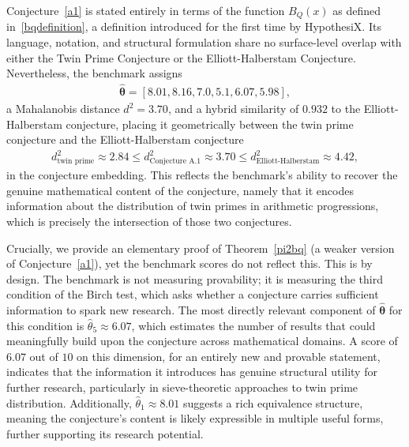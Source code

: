 \documentclass[11pt,reqno]{amsart}
\theoremstyle{plain}\newtheorem{theorem}{Theorem}[section]
\numberwithin{equation}{section}
\begin{document}
\noindent
Conjecture~\ref{a1} is stated entirely in terms of the function $B_Q(x)$ as defined in~\eqref{bqdefinition}, a definition introduced for the first time by HypothesiX. Its language, notation, and structural formulation share no surface-level overlap with either the Twin Prime Conjecture or the Elliott-Halberstam Conjecture. Nevertheless, the benchmark assigns
\begin{align*}
\hat{\bm{\theta}} = [8.01, 8.16, 7.0, 5.1, 6.07, 5.98],    
\end{align*}
\noindent
a Mahalanobis distance $d^2 = 3.70$, and a hybrid similarity of $0.932$ to the Elliott-Halberstam conjecture, placing it geometrically between the twin prime conjecture and the Elliott-Halberstam conjecture
\begin{align}\label{d2forbq}
d^2_{\text{twin prime}} \approx 2.84 
\leq d^2_{\text{Conjecture A.1}} \approx 3.70 
\leq d^2_{\text{Elliott-Halberstam}} \approx 4.42,
\end{align}
in the conjecture embedding. This reflects the benchmark's ability to recover the genuine mathematical content of the conjecture, namely that it encodes information about the distribution of twin primes in arithmetic progressions, which is precisely the intersection of those two conjectures.

\medskip
\noindent
Crucially, we provide an elementary proof of Theorem~\ref{pi2bq} 
(a weaker version of Conjecture~\ref{a1}), yet the benchmark scores do not reflect this. This is by design. The benchmark is not measuring provability; it is measuring the third condition of the Birch test, which asks whether a conjecture carries sufficient information to spark new research. The most directly relevant component of $\hat{\bm{\theta}}$ for this condition is $\hat{\theta}_5 \approx 6.07$, which estimates the number of results that could meaningfully build upon the conjecture across mathematical domains. A score of $6.07$ out of $10$ on this dimension, for an entirely new and provable statement, indicates that the information it introduces has genuine structural utility for further research, particularly in sieve-theoretic approaches to twin prime distribution. Additionally, $\hat{\theta}_1 \approx 8.01$ suggests a rich equivalence structure, meaning the conjecture's content is likely expressible in multiple useful 
forms, further supporting its research potential.
\end{document}
